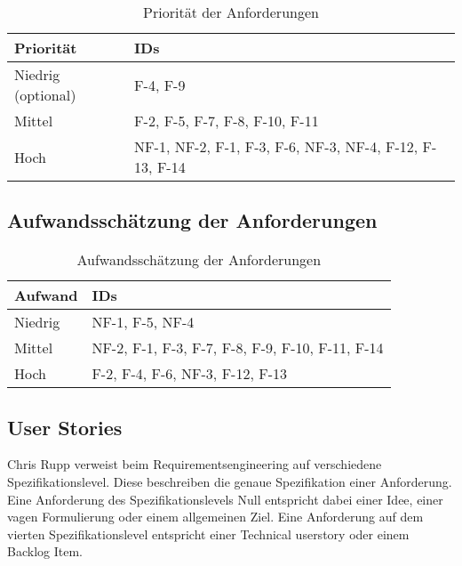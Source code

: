 \begin{table}[H]
    {
        \begin{tabularx}{\linewidth}{|X|X|}
            \hline
            Priorität & IDs                                                     \\
            \hline
            \cline{1-2}
            Niedrig (optional)
                      & F-4, F-9
            \\
            \cline{1-2}
            Mittel
                      & F-2, F-5, F-7, F-8, F-10, F-11
            \\
            \cline{1-2}
            Hoch
                      & NF-1, NF-2, F-1, F-3, F-6, NF-3, NF-4, F-12, F-13, F-14
            \\
            \hline
        \end{tabularx}
    }
    \caption{Priorität der Anforderungen}
    \label{tab:anforderungen2}
\end{table}

\subsection{Aufwandsschätzung der Anforderungen}
\label{subsec:anforderungen3}

\begin{table}[H]
    {
        \begin{tabularx}{\linewidth}{|X|X|}
            \hline
            Aufwand & IDs                                             \\
            \hline
            \cline{1-2}
            Niedrig
                    & NF-1, F-5, NF-4
            \\
            \cline{1-2}
            Mittel
                    & NF-2, F-1, F-3, F-7, F-8, F-9, F-10, F-11, F-14
            \\
            \cline{1-2}
            Hoch
                    & F-2, F-4, F-6, NF-3, F-12, F-13
            \\
            \hline
        \end{tabularx}
    }
    \caption{Aufwandsschätzung der Anforderungen}
    \label{tab:anforderungen3}
\end{table}

\subsection{User Stories}
\label{subsec:userstories}

Chris Rupp verweist beim Requirementsengineering auf verschiedene Spezifikationslevel. Diese beschreiben die genaue Spezifikation einer Anforderung. \newline
Eine Anforderung des Spezifikationslevels Null entspricht dabei einer Idee, einer vagen Formulierung oder einem allgemeinen Ziel. Eine Anforderung auf dem vierten Spezifikationslevel entspricht einer Technical \gls{userstory} oder einem Backlog Item. \cite[S.~38~ff.]{Rupp:ReqEng}

